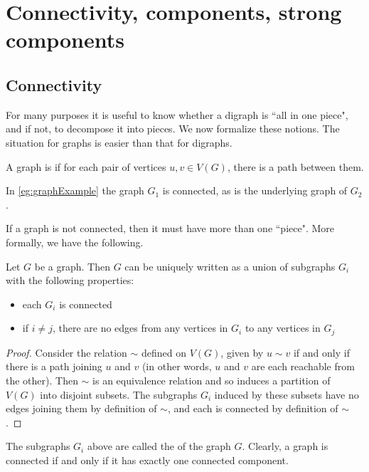 \chapter{Connectivity, components, strong components}

\section{Connectivity}
\label{sec:connectivity}

For many purposes it is useful to know whether a digraph is ``all in one
piece", and if not, to decompose it into pieces. We now formalize these
notions. The situation for graphs is easier than that for digraphs.

\begin{Definition} 
A graph is  if for each pair of 
vertices $u, v\in V(G)$, there is a path between them.
\end{Definition}

In \cref{eg:graphExample} the graph $G_1$ is connected, as is the
underlying graph of $G_2$. 

If a graph is not connected, then it must have more than one ``piece".
More formally, we have the following.

\begin{Theorem}
\label{thm:components}
Let $G$ be a graph. Then $G$ can be uniquely written as a union of
subgraphs $G_i$ with the following properties:
\begin{itemize}
\item each $G_i$ is connected
\item if $i\neq j$, there are no edges from any vertices in $G_i$ 
to any vertices in $G_j$
\end{itemize}
\end{Theorem}

\begin{proof}
Consider the relation $\sim$ defined on $V(G)$, given by $u\sim v$ if
and only if there is a path joining $u$ and $v$ (in other words, $u$ and
$v$ are each reachable from the other). Then $\sim$ is an equivalence
relation and so induces a partition of $V(G)$ into disjoint subsets. The
subgraphs $G_i$ induced by these subsets have no edges joining them by
definition of $\sim$, and each is connected by definition of $\sim$.
\end{proof}

The subgraphs $G_i$ above are called the 
of the graph $G$. Clearly, a graph is connected if and only if it has
exactly one connected component.

